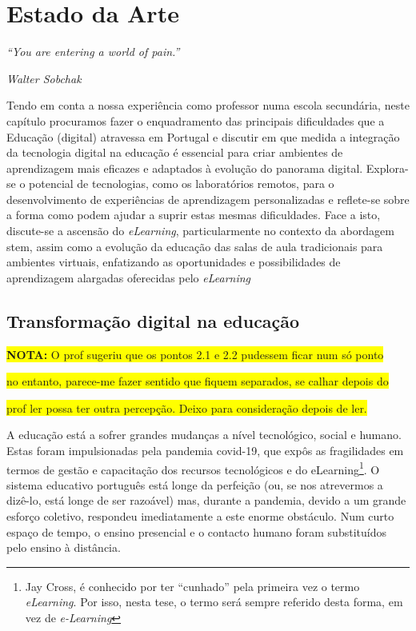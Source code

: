 \chapter{Estado da Arte}
\label{Capitulo2}

\begin{center}
    \textit{``You are entering a world of pain.''}
    
    \textit{Walter Sobchak}

\end{center}

Tendo em conta a nossa experiência como professor numa escola secundária, neste capítulo procuramos  fazer o enquadramento das principais dificuldades que a Educação (digital) atravessa em Portugal e discutir em que medida a integração da tecnologia digital na educação é essencial para criar ambientes de aprendizagem mais eficazes e adaptados à evolução do panorama digital. Explora-se o potencial de tecnologias, como os laboratórios remotos, para o desenvolvimento de experiências de aprendizagem personalizadas e reflete-se sobre a forma como podem ajudar a suprir estas mesmas dificuldades.
Face a isto, discute-se a ascensão do \textit{eLearning}, particularmente no contexto da abordagem \acrshort{stem}, assim como a evolução da educação das salas de aula tradicionais para ambientes virtuais, enfatizando as oportunidades e possibilidades de aprendizagem alargadas oferecidas pelo \textit{eLearning}

\section{Transformação digital na educação}
\label{sec:transformaçãodigital}

\colorbox{yellow}{\textbf{NOTA:} O prof sugeriu que os pontos 2.1 e 2.2 pudessem ficar num só ponto}

\colorbox{yellow}{ no entanto, parece-me fazer sentido que fiquem separados, se calhar depois do}

\colorbox{yellow}{prof ler possa ter outra percepção. Deixo para consideração depois de ler.}

A educação está a sofrer grandes mudanças a nível tecnológico, social e humano. Estas foram impulsionadas pela pandemia \acrfull{covid-19}, que expôs as fragilidades em termos de gestão e capacitação dos recursos tecnológicos e do eLearning\footnote{Jay Cross, é conhecido por ter ``cunhado'' pela primeira vez o termo \textit{eLearning}\cite{jaycross}. Por isso, nesta tese, o termo será sempre referido desta forma, em vez de \textit{e-Learning}}. O sistema educativo português está longe da perfeição (ou, se nos atrevermos a dizê-lo, está longe de ser razoável) mas, durante a pandemia, devido a um grande esforço coletivo, respondeu imediatamente a este enorme obstáculo. Num curto espaço de tempo, o ensino presencial e o contacto humano foram substituídos pelo ensino à distância.

